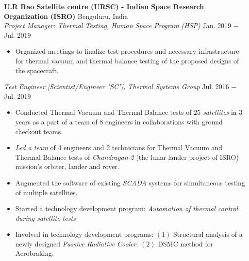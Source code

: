 \documentclass[letterpaper,10pt]{article}
\begin{document}
\vspace{5pt}
\noindent \textbf{U.R Rao Satellite centre (URSC) - Indian Space Research Organization (ISRO)} \hfill Benguluru, India \\
\textit{Project Manager: Thermal Testing, Human Space Program (HSP)} \hfill Jan. 2019 $-$ Jul. 2019
\begin{itemize}[noitemsep,nolistsep,leftmargin=0.25in,label={--}]
    \item Organized meetings to finalize test procedures and necessary infrastructure for thermal vacuum and thermal balance testing of the proposed designs of the spacecraft.
\end{itemize}

\vspace{3pt}
\textit{Test Engineer [Scientist/Engineer "SC"], Thermal Systems Group} \hfill Jul. 2016 $-$ Jul. 2019
\begin{itemize}[noitemsep,nolistsep,leftmargin=0.25in,label={--}]
    \item Conducted Thermal Vacuum and Thermal Balance tests of $25$ \textit{satellites} in 3 years as a part of a team of 8 engineers in collaborations with ground checkout teams.
	\item \textit{Led a team} of 4 engineers and 2 technicians for Thermal Vacuum and Thermal Balance tests of \textit{Chandrayan-2} (the lunar lander project of ISRO) mission's orbiter, lander and rover.
    \item Augmented the software of existing \textit{SCADA} systems for simultaneous testing of multiple satellites.
	\item Started a technology development program: \textit{Automation of thermal control during satellite tests}
	\item Involved in technology development programs: $(1)$ Structural analysis of a newly designed \textit{Passive Radiative Cooler}. $(2)$ DSMC method for Aerobraking.
\end{itemize}



\end{document}
